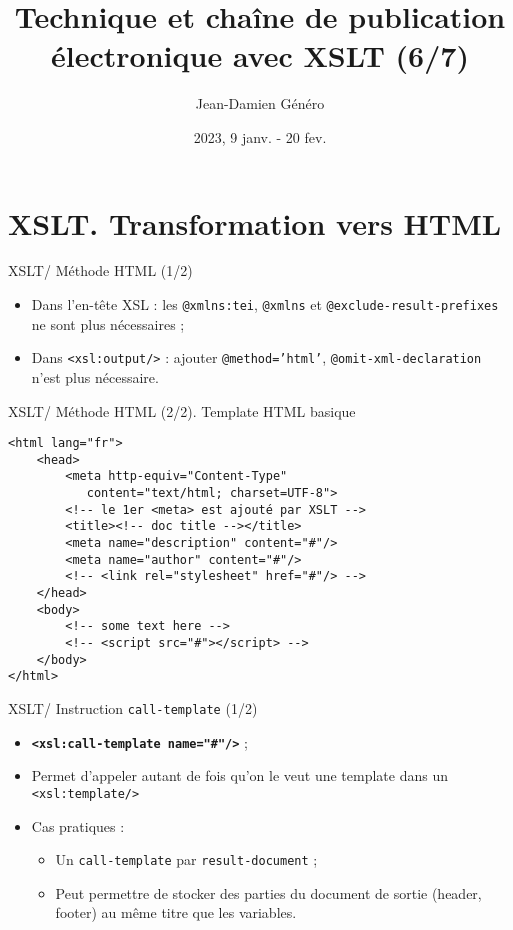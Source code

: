 \documentclass{beamer}
\title{Technique et chaîne de publication électronique avec XSLT (6/7)}
\date{2023, 9 janv. - 20 fev.}
\author{Jean-Damien Généro}
\institute{École nationale des chartes -- M2 TNAH}
\begin{document}
    \maketitle

    \section{XSLT. Transformation vers HTML}

    \begin{frame}{XSLT/ Méthode HTML (1/2)}
        \Large
        \begin{itemize}
            \item Dans l'en-tête XSL : les \texttt{@xmlns:tei}, \texttt{@xmlns} et \texttt{@exclude-result-prefixes} ne sont plus nécessaires ;
            \bigskip
            \item Dans \texttt{<xsl:output/>} : ajouter \texttt{@method='html'}, \texttt{@omit-xml-declaration} n'est plus nécessaire.
        \end{itemize}
    \end{frame}

    \begin{frame}[fragile]{XSLT/ Méthode HTML (2/2). Template HTML basique}
        \begin{verbatim}
<html lang="fr">
    <head>
        <meta http-equiv="Content-Type" 
           content="text/html; charset=UTF-8">
        <!-- le 1er <meta> est ajouté par XSLT -->
        <title><!-- doc title --></title>
        <meta name="description" content="#"/>
        <meta name="author" content="#"/>
        <!-- <link rel="stylesheet" href="#"/> -->
    </head>
    <body>
        <!-- some text here -->
        <!-- <script src="#"></script> -->
    </body>
</html>
        \end{verbatim}
    \end{frame}
    
    \begin{frame}{XSLT/ Instruction \texttt{call-template} (1/2)}
        \Large
        \begin{itemize}
            \item \textbf{\texttt{<xsl:call-template name="\#"/>}} ;
            \item Permet d'appeler autant de fois qu'on le veut une template dans un \texttt{<xsl:template/>}
            \item Cas pratiques :
            \begin{itemize}
            \Large
                \item Un \texttt{call-template} par \texttt{result-document} ;
                \item Peut permettre de stocker des parties du document de sortie (header, footer) au même titre que les variables.
            \end{itemize}
        \end{itemize}
    \end{frame}
\end{document}
